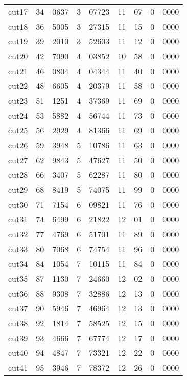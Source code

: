 \documentclass[11pt]{article}
\begin{document}
\begin{center}
\begin{tabular}{lr@{.}lr@{.}lr@{.}lr@{.}l}
cut17 &
  34&0637 &
    3&07723 &
      11&07 &
        0&0000 \\
cut18 &
  36&5005 &
    3&27315 &
      11&15 &
        0&0000 \\
cut19 &
  39&2010 &
    3&52603 &
      11&12 &
        0&0000 \\
cut20 &
  42&7090 &
    4&03852 &
      10&58 &
        0&0000 \\
cut21 &
  46&0804 &
    4&04344 &
      11&40 &
        0&0000 \\
cut22 &
  48&6605 &
    4&20379 &
      11&58 &
        0&0000 \\
cut23 &
  51&1251 &
    4&37369 &
      11&69 &
        0&0000 \\
cut24 &
  53&5882 &
    4&56744 &
      11&73 &
        0&0000 \\
cut25 &
  56&2929 &
    4&81366 &
      11&69 &
        0&0000 \\
cut26 &
  59&3948 &
    5&10786 &
      11&63 &
        0&0000 \\
cut27 &
  62&9843 &
    5&47627 &
      11&50 &
        0&0000 \\
cut28 &
  66&3407 &
    5&62287 &
      11&80 &
        0&0000 \\
cut29 &
  68&8419 &
    5&74075 &
      11&99 &
        0&0000 \\
cut30 &
  71&7154 &
    6&09821 &
      11&76 &
        0&0000 \\
cut31 &
  74&6499 &
    6&21822 &
      12&01 &
        0&0000 \\
cut32 &
  77&4769 &
    6&51701 &
      11&89 &
        0&0000 \\
cut33 &
  80&7068 &
    6&74754 &
      11&96 &
        0&0000 \\
cut34 &
  84&1054 &
    7&10115 &
      11&84 &
        0&0000 \\
cut35 &
  87&1130 &
    7&24660 &
      12&02 &
        0&0000 \\
cut36 &
  88&9308 &
    7&32886 &
      12&13 &
        0&0000 \\
cut37 &
  90&5946 &
    7&46964 &
      12&13 &
        0&0000 \\
cut38 &
  92&1814 &
    7&58525 &
      12&15 &
        0&0000 \\
cut39 &
  93&4666 &
    7&67774 &
      12&17 &
        0&0000 \\
cut40 &
  94&4847 &
    7&73321 &
      12&22 &
        0&0000 \\
cut41 &
  95&3946 &
    7&78372 &
      12&26 &
        0&0000 \\

\end{tabular}
\end{center}
\end{document}
